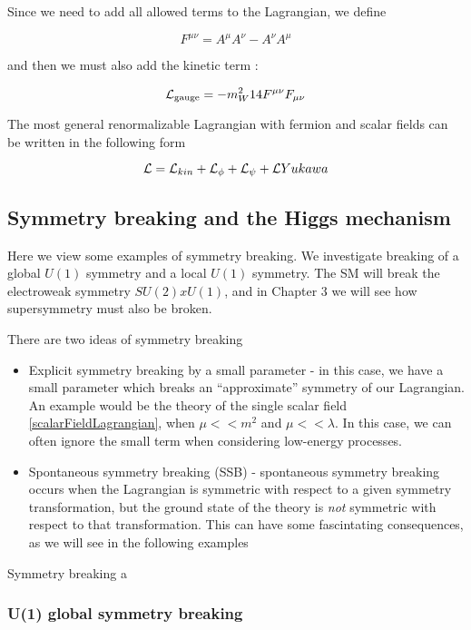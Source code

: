 Since we need to add all allowed terms to the Lagrangian, we define

\begin{equation}
F^{\mu\nu} = A^\mu A^\nu - A^\nu A^\mu
\end{equation}

and then we must also add the kinetic term :

\begin{equation}
\mathcal{L}_{\text{gauge}} = - m_W^2{1}{4} F^{\mu\nu} F_{\mu\nu}
\end{equation}

The most general renormalizable Lagrangian with fermion and scalar fields can be written in the following form

\begin{equation}
\mathcal{L} = \mathcal{L}_{kin} + \mathcal{L}_{\phi} + \mathcal{L}_\psi +   \mathcal{L}{Yukawa}
\end{equation}

\subsection{Symmetry breaking and the Higgs mechanism}
\label{subsec:symmetry_breaking}
Here we view some examples of symmetry breaking.
We investigate breaking of a global $U(1)$ symmetry and a local $U(1)$ symmetry.
The SM will break the electroweak symmetry $SU(2) x U(1)$, and in Chapter 3 we will see how supersymmetry must also be broken.

There are two ideas of symmetry breaking
\begin{itemize}
\item Explicit symmetry breaking by a small parameter - in this case, we have a small parameter which breaks an ``approximate'' symmetry of our Lagrangian.
An example would be the theory of the single scalar field \ref{scalarFieldLagrangian}, when $\mu << m^2$ and $\mu << \lambda$.
In this case, we can often ignore the small term when considering low-energy processes.
\item Spontaneous symmetry breaking (SSB) - spontaneous symmetry breaking occurs when the Lagrangian is symmetric with respect to a given symmetry transformation, but the ground state of the theory is \textit{not} symmetric with respect to that transformation.
This can have some fascintating consequences, as we will see in the following examples
\end{itemize}
Symmetry breaking a

\subsubsection{U(1) global symmetry breaking}

